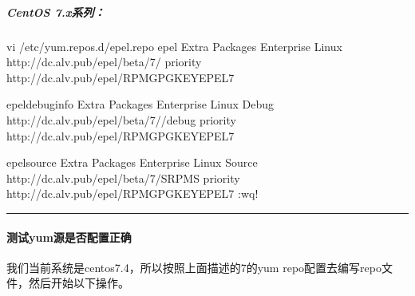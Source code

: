 \documentclass[letterpaper,10pt,english]{sphinxmanual}
\begin{document}
\subparagraph{CentOS 7.x系列：}
\label{\detokenize{software_manage/yum/yum_official_sync:id16}}
%
\begin{sphinxVerbatim}[commandchars=\\\{\}]
vi /etc/yum.repos.d/epel.repo 
\PYG{o}{[}epel\PYG{o}{]}
Extra Packages  Enterprise Linux  \PYGZhy{} 
http://dc.alv.pub/epel/beta/7/
priority
 http://dc.alv.pub/epel/RPM\PYGZhy{}GPG\PYGZhy{}KEY\PYGZhy{}EPEL\PYGZhy{}7

\PYG{o}{[}epel\PYGZhy{}debuginfo\PYG{o}{]}
Extra Packages  Enterprise Linux  \PYGZhy{}  \PYGZhy{} Debug
http://dc.alv.pub/epel/beta/7//debug
priority
 http://dc.alv.pub/epel/RPM\PYGZhy{}GPG\PYGZhy{}KEY\PYGZhy{}EPEL\PYGZhy{}7

\PYG{o}{[}epel\PYGZhy{}source\PYG{o}{]}
Extra Packages  Enterprise Linux  \PYGZhy{}  \PYGZhy{} Source
http://dc.alv.pub/epel/beta/7/SRPMS
priority
 http://dc.alv.pub/epel/RPM\PYGZhy{}GPG\PYGZhy{}KEY\PYGZhy{}EPEL\PYGZhy{}7
:wq! 
\end{sphinxVerbatim}


\bigskip\hrule\bigskip



\paragraph{测试yum源是否配置正确}
\label{\detokenize{software_manage/yum/yum_official_sync:id17}}
我们当前系统是centos7.4，所以按照上面描述的7的yum repo配置去编写repo文件，然后开始以下操作。

%
\begin{sphinxVerbatim}[commandchars=\\\{\}]
   
  
  
\end{sphinxVerbatim}
\end{document}
